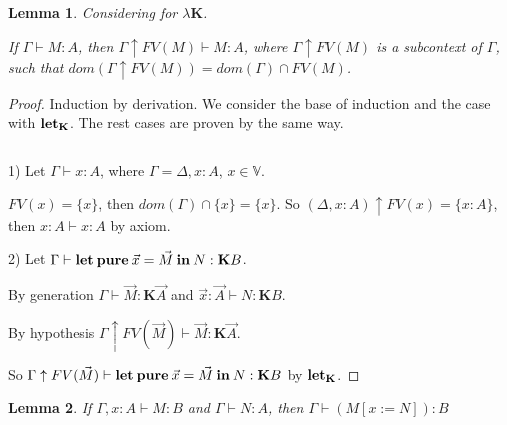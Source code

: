 \documentclass[a4paper]{article}
\newtheorem{lemma}{Lemma}
\begin{document}
  \begin{lemma} Considering for $\lambda \textbf{K}$.

  If $\Gamma \vdash M : A$, then $\Gamma \uparrow FV(M) \vdash M : A$, where $\Gamma \uparrow
  FV(M)$ is a subcontext of $\Gamma$, such that $dom(\Gamma \uparrow FV(M)) = dom(\Gamma) \cap FV(M)$.

  \end{lemma}

  \begin{proof}

  Induction by derivation. We consider the base of induction and the case with  ${\bf let}_{\textbf{K}}$. The rest
  cases are
  proven by the same way.

  $ $

  1) Let $\Gamma \vdash x : A$, where $\Gamma = \Delta, x : A$, $x \in \mathbb{V}$.

  $FV(x) = \{ x\}$, then $dom(\Gamma) \cap \{ x\} = \{ x\}. $ So $(\Delta, x : A) \uparrow FV(x) = \{ x
  : A\}$, then $x : A \vdash x : A$ by axiom.

  2) Let $\Gamma \vdash {\bf let \: pure \:} \vec{x} = \vec{M} {\bf \: in \:} N : \textbf{K}B$.

  By generation $\Gamma \vdash \vec{M} : \textbf{K}\vec{A}$ and $\vec{x} : \vec{A} \vdash N : \textbf{K}B$.

  By hypothesis $\Gamma \uparrow FV(\vec{M}) \vdash \vec{M} : \textbf{K}\vec{A}$.

  So $\Gamma \uparrow FV(\vec{M}) \vdash {\bf let \: pure \:} \vec{x} = \vec{M} {\bf \: in \:} N : \textbf{K}B$ by ${\bf let}_{\textbf{K}}$.

  \end{proof}

  \vspace{\baselineskip}

  \begin{lemma}

  If $\Gamma, x : A \vdash M : B$  and $\Gamma \vdash N : A$, then $\Gamma \vdash (M [x := N]) :
  B $

  \end{lemma}
\end{document}
